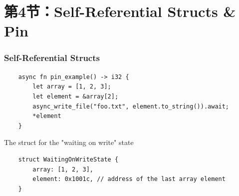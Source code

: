 \section{第4节：Self-Referential Structs \& Pin} %
\begin{frame}[fragile]
    \frametitle{Self-Referential Structs}
% 
% 
% 
% 
\begin{block}{}
    \begin{verbatim}
    async fn pin_example() -> i32 {
        let array = [1, 2, 3];
        let element = &array[2];
        async_write_file("foo.txt", element.to_string()).await;
        *element
    } \end{verbatim}
\end{block} \pause
The struct for the "waiting on write" state
% 
\begin{block}{}
    \begin{verbatim}
    struct WaitingOnWriteState {
        array: [1, 2, 3],
        element: 0x1001c, // address of the last array element
    } \end{verbatim}
\end{block}
% 
\end{frame}
